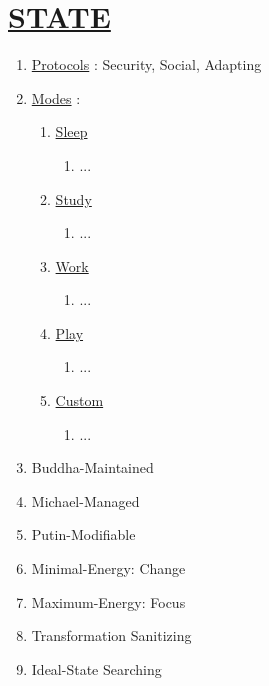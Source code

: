 \documentclass[11pt]{article}
\begin{document}
\section*{\ul{STATE}}
\begin{enumerate}
	\item[] \ul{Protocols} : Security, Social, Adapting

	\item[] \ul{Modes} :
	\begin{enumerate}
		\item[] \ul{Sleep}
		\begin{enumerate}
			\item[] ...
		\end{enumerate}
		
		\item[] \ul{Study}
		\begin{enumerate}
			\item[] ...
		\end{enumerate}
		
		\item[] \ul{Work}
		\begin{enumerate}
			\item[] ...
		\end{enumerate}
		
		\item[] \ul{Play}
		\begin{enumerate}
			\item[] ...
		\end{enumerate}
		
		\item[] \ul{Custom}
		\begin{enumerate}
			\item[] ...
		\end{enumerate}
	\end{enumerate}	
	
	\item[] Buddha-Maintained
	\item[] Michael-Managed
	\item[] Putin-Modifiable
	\item[] Minimal-Energy: Change
	\item[] Maximum-Energy: Focus
	\item[] Transformation Sanitizing
	\item[] Ideal-State Searching
\end{enumerate}
\end{document}
